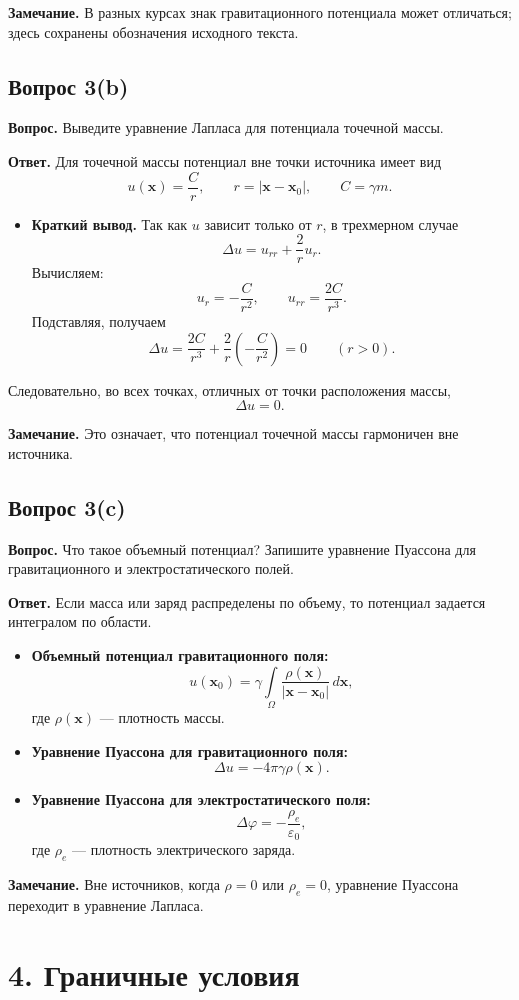 \documentclass[a4paper,12pt]{article}
\newcommand{\Question}[2]{\subsection*{Вопрос #1}\textbf{Вопрос.} #2}
\newcommand{\Answer}{\textbf{Ответ.}}
\begin{document}
\textbf{Замечание.} В разных курсах знак гравитационного потенциала может отличаться; здесь сохранены обозначения исходного текста.

\Question{3(b)}{Выведите уравнение Лапласа для потенциала точечной массы.}

\Answer
Для точечной массы потенциал вне точки источника имеет вид
\[
u(\mathbf{x})=\frac{C}{r},
\qquad
r=|\mathbf{x}-\mathbf{x}_0|,
\qquad
C=\gamma m.
\]

\begin{itemize}
  \item \textbf{Краткий вывод.} Так как $u$ зависит только от $r$, в трехмерном случае
  \[
  \Delta u=u_{rr}+\frac{2}{r}u_r.
  \]
  Вычисляем:
  \[
  u_r=-\frac{C}{r^2},
  \qquad
  u_{rr}=\frac{2C}{r^3}.
  \]
  Подставляя, получаем
  \[
  \Delta u=\frac{2C}{r^3}+\frac{2}{r}\left(-\frac{C}{r^2}\right)=0
  \qquad (r>0).
  \]
\end{itemize}

Следовательно, во всех точках, отличных от точки расположения массы,
\[
\Delta u=0.
\]

\textbf{Замечание.} Это означает, что потенциал точечной массы гармоничен вне источника.

\Question{3(c)}{Что такое объемный потенциал? Запишите уравнение Пуассона для гравитационного и электростатического полей.}

\Answer
Если масса или заряд распределены по объему, то потенциал задается интегралом по области.

\begin{itemize}
  \item \textbf{Объемный потенциал гравитационного поля:}
  \[
  u(\mathbf{x}_0)=
  \gamma\int\limits_{\Omega}
  \frac{\rho(\mathbf{x})}{|\mathbf{x}-\mathbf{x}_0|}\,d\mathbf{x},
  \]
  где $\rho(\mathbf{x})$ --- плотность массы.

  \item \textbf{Уравнение Пуассона для гравитационного поля:}
  \[
  \Delta u=-4\pi\gamma\rho(\mathbf{x}).
  \]

  \item \textbf{Уравнение Пуассона для электростатического поля:}
  \[
  \Delta \varphi=-\frac{\rho_e}{\varepsilon_0},
  \]
  где $\rho_e$ --- плотность электрического заряда.
\end{itemize}

\textbf{Замечание.} Вне источников, когда $\rho=0$ или $\rho_e=0$, уравнение Пуассона переходит в уравнение Лапласа.

\section*{4. Граничные условия}
\end{document}
